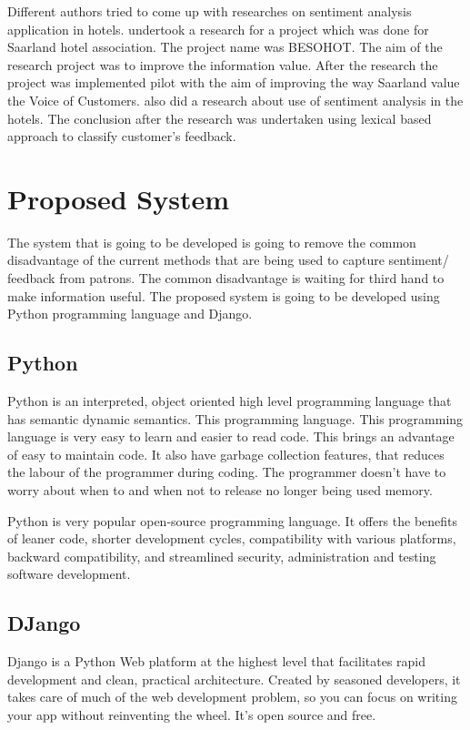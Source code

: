 \documentclass[12pt]{report}
\begin{document}
	
	Different authors tried to come up with researches on sentiment analysis application in hotels. \cite{kasper2012monitoring} undertook a research for a project which was done for Saarland hotel association. The project name was BESOHOT. The aim of the research project was to improve the information value. After the research the project was implemented pilot with the aim of improving the way Saarland value the Voice of Customers. \cite{grabner2012classification} also did a research about use of sentiment analysis in the hotels. The conclusion after the research was undertaken using lexical based approach to classify customer's feedback.\\
	
	\section{Proposed System}
	The system that is going to be developed is going to remove the common disadvantage of the current methods that are being used to capture sentiment/ feedback from patrons. The common disadvantage is waiting for third hand to make information useful. The proposed system is going to be developed using Python programming language and Django.
	
	\subsection{Python}
	Python is an interpreted, object oriented high level programming language that has semantic dynamic semantics. This programming language. This programming language is very easy to learn and easier to read code. This brings an advantage of easy to maintain code. It also have garbage collection features, that reduces the labour of the programmer during coding. The programmer doesn't have to worry about when to and when not to release no longer being used memory.
	
	Python is very popular open-source programming language. It offers the benefits of leaner code, shorter development cycles, compatibility with various platforms, backward compatibility, and streamlined security, administration and testing software development.
	
	\subsection{DJango}
	Django is a Python Web platform at the highest level that facilitates rapid development and clean, practical architecture. Created by seasoned developers, it takes care of much of the web development problem, so you can focus on writing your app without reinventing the wheel. It's open source and free.
	
\end{document}
